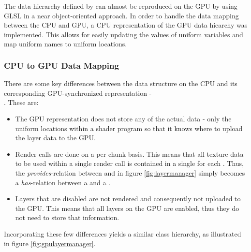 The data hierarchy defined by  can almost be reproduced on the GPU by using GLSL in a near object-oriented approach. In order to handle the data mapping between the CPU and GPU, a CPU representation of the GPU data hiearchy was implemented. This allows for easily updating the values of uniform variables and map uniform names to uniform locations.

\subsubsection{CPU to GPU Data Mapping}

There are some key differences between the  data structure on the CPU and its corresponding GPU-synchronized representation - \\ . These are:

\begin{itemize}
\item The GPU representation does not store any of the actual  data - only the uniform locations within a shader program so that it knows where to upload the layer data to the GPU. 
\item Render calls are done on a per chunk basis. This means that all texture data to be used within a single render call is contained in a single  for each . Thus, the \emph{provides}-relation between  and  in figure \ref{fig:layermanager} simply becomes a \emph{has}-relation between a  and a .
\item Layers that are disabled are not rendered and consequently not uploaded to the GPU. This means that all layers on the GPU are enabled, thus they do not need to store that information.
\end{itemize}

Incorporating these few differences yields a similar class hierarchy, as illustrated in figure \ref{fig:gpulayermanager}. 

